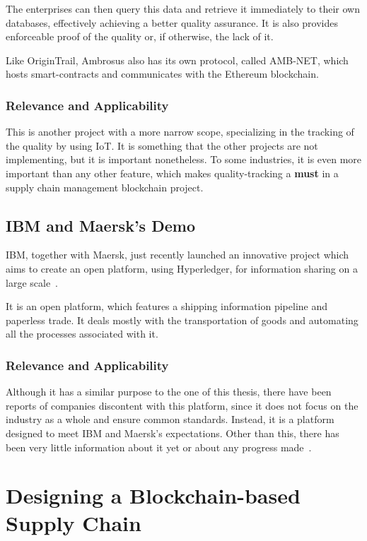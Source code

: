 The enterprises can then query this data and retrieve it immediately to their own databases, effectively achieving a better quality assurance. It is also provides enforceable proof of the quality or, if otherwise, the lack of it.

Like OriginTrail, Ambrosus also has its own protocol, called AMB-NET, which hosts smart-contracts and communicates with the Ethereum blockchain.

\subsubsection{Relevance and Applicability}
This is another project with a more narrow scope, specializing in the tracking of the quality by using IoT. It is something that the other projects are not implementing, but it is important nonetheless. To some industries, it is even more important than any other feature, which makes quality-tracking a \textbf{must} in a supply chain management blockchain project.

\subsection{IBM and Maersk's Demo}
IBM, together with Maersk, just recently launched an innovative project which aims to create an open platform, using Hyperledger, for information sharing on a large scale~\cite{A.P.MOLLER-MAERSK}.

It is an open platform, which features a shipping information pipeline and paperless trade. It deals mostly with the transportation of goods and automating all the processes associated with it. 

\subsubsection{Relevance and Applicability}

Although it has a similar purpose to the one of this thesis, there have been reports of companies discontent with this platform, since it does not focus on the industry as a whole and ensure common standards. Instead, it is a platform designed to meet IBM and Maersk's expectations. Other than this, there has been very little information about it yet or about any progress made~\cite{Andersen2018}.

\section{Designing a Blockchain-based Supply Chain}

